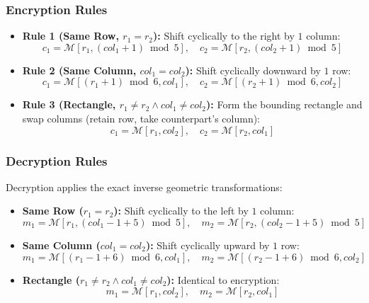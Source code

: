 \documentclass[12pt,a4paper]{article}
\begin{document}
\subsubsection{Encryption Rules}
\begin{itemize}
    \item \textbf{Rule 1 (Same Row, $r_1 = r_2$):} Shift cyclically to the right by $1$ column:
    \begin{equation}
        c_1 = \mathcal{M}[r_1, (col_1 + 1) \bmod 5], \quad c_2 = \mathcal{M}[r_2, (col_2 + 1) \bmod 5]
    \end{equation}
    \item \textbf{Rule 2 (Same Column, $col_1 = col_2$):} Shift cyclically downward by $1$ row:
    \begin{equation}
        c_1 = \mathcal{M}[(r_1 + 1) \bmod 6, col_1], \quad c_2 = \mathcal{M}[(r_2 + 1) \bmod 6, col_2]
    \end{equation}
    \item \textbf{Rule 3 (Rectangle, $r_1 \ne r_2 \land col_1 \ne col_2$):} Form the bounding rectangle and swap columns (retain row, take counterpart's column):
    \begin{equation}
        c_1 = \mathcal{M}[r_1, col_2], \quad c_2 = \mathcal{M}[r_2, col_1]
    \end{equation}
\end{itemize}

\subsubsection{Decryption Rules}
Decryption applies the exact inverse geometric transformations:
\begin{itemize}
    \item \textbf{Same Row ($r_1 = r_2$):} Shift cyclically to the left by $1$ column:
    \begin{equation}
        m_1 = \mathcal{M}[r_1, (col_1 - 1 + 5) \bmod 5], \quad m_2 = \mathcal{M}[r_2, (col_2 - 1 + 5) \bmod 5]
    \end{equation}
    \item \textbf{Same Column ($col_1 = col_2$):} Shift cyclically upward by $1$ row:
    \begin{equation}
        m_1 = \mathcal{M}[(r_1 - 1 + 6) \bmod 6, col_1], \quad m_2 = \mathcal{M}[(r_2 - 1 + 6) \bmod 6, col_2]
    \end{equation}
    \item \textbf{Rectangle ($r_1 \ne r_2 \land col_1 \ne col_2$):} Identical to encryption:
    \begin{equation}
        m_1 = \mathcal{M}[r_1, col_2], \quad m_2 = \mathcal{M}[r_2, col_1]
    \end{equation}
\end{itemize}
\end{document}

